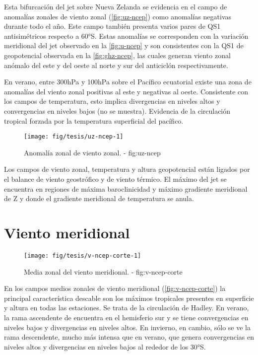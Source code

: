 \documentclass[spanish,a4paper]{book}
\begin{document}
Esta bifurcación del jet sobre Nueva Zelanda se evidencia en el campo de
anomalías zonales de viento zonal (\autoref{fig:uz-ncep}) como anomalías
negativas durante todo el año. Este campo también presenta varios pares
de QS1 antisimétricos respecto a 60°S. Estas anomalías se corresponden
con la variación meridional del jet observado en la \autoref{fig:u-ncep}
y son consistentes con la QS1 de geopotencial observada en la
\autoref{fig:ghz-ncep}, las cuales generan viento zonal anómalo del este
y del oeste al norte y sur del anticiclón respectivamente.

En verano, entre 300hPa y 100hPa sobre el Pacífico ecuatorial existe una
zona de anomalías del viento zonal positivas al este y negativas al
oeste. Consistente con los campos de temperatura, esto implica
divergencias en niveles altos y convergencias en niveles bajos (no se
muestra). Evidencia de la circulación tropical forzada por la
temperatura superficial del pacífico.

\begin{landscape}\begin{figure}

{\centering \texttt{[image: fig/tesis/uz-ncep-1]} 

}

\caption{Anomalía zonal de viento zonal. - fig:uz-ncep}\label{fig:uz-ncep}
\end{figure}
\end{landscape}

Los campos de viento zonal, temperatura y altura geopotencial están
ligados por el balance de viento geostrófico y de viento térmico. El
máximo del jet se encuentra en regiones de máxima baroclinicidad y
máximo gradiente meridional de Z y donde el gradiente meridional de
temperatura se anula.

\section{Viento meridional}\label{viento-meridional}

\begin{figure}

{\centering \texttt{[image: fig/tesis/v-ncep-corte-1]} 

}

\caption{Media zonal del viento meridional. - fig:v-ncep-corte}\label{fig:v-ncep-corte}
\end{figure}

En los campos medios zonales de viento meridional
(\autoref{fig:v-ncep-corte}) la principal característica descable son
los máximos tropicales presentes en superficie y altura en todas las
estaciones. Se trata de la circulación de Hadley. En verano, la rama
ascendente de encuentra en el hemisferio sur y se tiene convergencias en
niveles bajos y divergencias en niveles altos. En invierno, en cambio,
sólo se ve la rama descendente, mucho más intensa que en verano, que
genera convergencias en niveles altos y divergencias en niveles bajos al
rededor de los 30°S.
\end{document}
